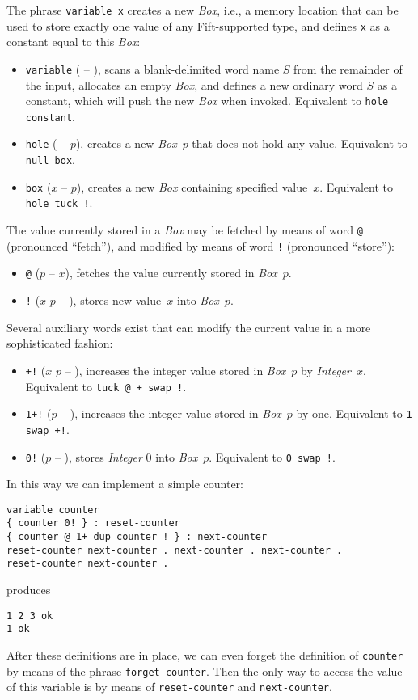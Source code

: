 \documentclass[12pt,oneside]{article}
\begin{document}
The phrase {\tt variable x} creates a new {\em Box}, i.e., a memory location that can be used to store exactly one value of any Fift-supported type, and defines {\tt x} as a constant equal to this {\em Box\/}:
\begin{itemize}
\item {\tt variable} ( -- ), scans a blank-delimited word name $S$ from the remainder of the input, allocates an empty {\em Box}, and defines a new ordinary word $S$ as a constant, which will push the new {\em Box\/} when invoked. Equivalent to {\tt hole constant}.
\item {\tt hole} ( -- $p$), creates a new {\em Box\/}~$p$ that does not hold any value. Equivalent to {\tt null box}.
\item {\tt box} ($x$ -- $p$), creates a new {\em Box\/} containing specified value~$x$. Equivalent to {\tt hole tuck !}.
\end{itemize}
The value currently stored in a {\em Box\/} may be fetched by means of word {\tt @} (pronounced ``fetch''), and modified by means of word {\tt !} (pronounced ``store''):
\begin{itemize}
\item {\tt @} ($p$ -- $x$), fetches the value currently stored in {\em Box\/}~$p$.
\item {\tt !} ($x$ $p$ -- ), stores new value~$x$ into {\em Box\/}~$p$.
\end{itemize}
Several auxiliary words exist that can modify the current value in a more sophisticated fashion:
\begin{itemize}
\item {\tt +!} ($x$ $p$ -- ), increases the integer value stored in {\em Box\/}~$p$ by {\em Integer\/}~$x$. Equivalent to {\tt tuck @ + swap !}.
\item {\tt 1+!} ($p$ -- ), increases the integer value stored in {\em Box\/}~$p$ by one. Equivalent to {\tt 1 swap +!}.
\item {\tt 0!} ($p$ -- ), stores {\em Integer\/} $0$ into {\em Box\/}~$p$. Equivalent to {\tt 0 swap !}.
\end{itemize}
In this way we can implement a simple counter:
\begin{verbatim}
variable counter
{ counter 0! } : reset-counter
{ counter @ 1+ dup counter ! } : next-counter
reset-counter next-counter . next-counter . next-counter .
reset-counter next-counter .
\end{verbatim}
produces
\begin{verbatim}
1 2 3 ok
1 ok
\end{verbatim}
After these definitions are in place, we can even forget the definition of {\tt counter} by means of the phrase {\tt forget counter}. Then the only way to access the value of this variable is by means of {\tt reset-counter} and {\tt next-counter}.
\end{document}
